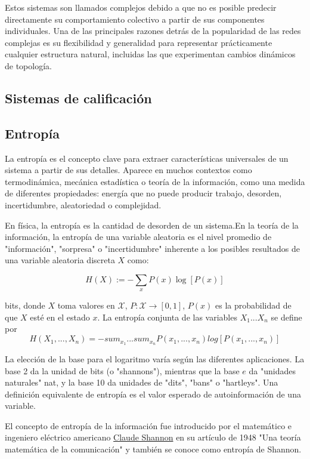 Estos sistemas son llamados complejos debido a que no es posible predecir directamente su 
comportamiento colectivo a partir de sus componentes individuales. Una de las principales razones detrás de 
la popularidad de las redes complejas es su flexibilidad
y generalidad para representar prácticamente cualquier estructura natural, incluidas las que experimentan 
cambios dinámicos de topología.\cite{CN-review}
\subsection{Sistemas de calificación}

\subsection{Entropía}
La entropía es el concepto clave para extraer características universales de un sistema a partir de sus 
detalles. Aparece en muchos contextos como termodinámica, mecánica estadística o teoría de la información, como 
una medida de diferentes propiedades: energía que no puede producir trabajo, desorden, incertidumbre, 
aleatoriedad o complejidad.\cite{gen-entr-review}

\begin{definicion}[Entropía]\label{def:entropy}
En física, la entropía es la cantidad de desorden de un sistema.En la teoría de la información, 
la entropía de una variable aleatoria es el nivel promedio de "información", "sorpresa" o "incertidumbre" 
inherente a los posibles resultados de una variable aleatoria discreta $X$ como\cite{t-entropy}:  

$$H(X):= - \sum_{x} P(x)\log[P(x)]$$

bits, donde $X$ toma valores en $\mathcal{X}$, $P:\mathcal{X} \rightarrow [0,1]$, $P(x)$ es la 
probabilidad de que $X$ esté en el estado $x$. La 
entropía conjunta de las variables $X_1...X_n$ se define por 
$$H(X_1,...,X_n)=-sum_{x_1}...sum_{x_n}P(x_1,...,x_n)log[P(x_1,...,x_n)]$$
\end{definicion}

La elección de la base para el logaritmo varía según las diferentes 
aplicaciones. La base 2 da la unidad de bits (o "shannons"), mientras que la base $e$ da "unidades naturales" 
nat, y la base 10 da unidades de "dits", "bans" o "hartleys". Una definición equivalente de entropía es 
el valor esperado de autoinformación de una variable.

El concepto de entropía de la información fue introducido por el matemático e ingeniero eléctrico americano 
\href{https://en.wikipedia.org/wiki/Claude_Shannon}{Claude Shannon} en su artículo 
de 1948 "Una teoría matemática de la comunicación"\cite{shannon-1948} y también se conoce como entropía de Shannon.


